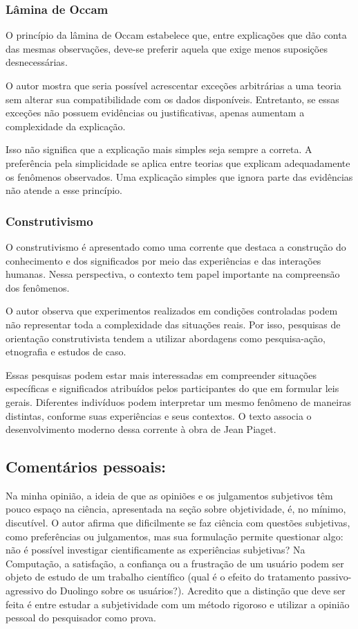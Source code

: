 \documentclass[12pt,a4paper]{article}
\begin{document}
\subsubsection{Lâmina de Occam}

O princípio da lâmina de Occam estabelece que, entre explicações que dão conta das mesmas observações, deve-se preferir aquela que exige menos suposições desnecessárias.

O autor mostra que seria possível acrescentar exceções arbitrárias a uma teoria sem alterar sua compatibilidade com os dados disponíveis. Entretanto, se essas exceções não possuem evidências ou justificativas, apenas aumentam a complexidade da explicação.

Isso não significa que a explicação mais simples seja sempre a correta. A preferência pela simplicidade se aplica entre teorias que explicam adequadamente os fenômenos observados. Uma explicação simples que ignora parte das evidências não atende a esse princípio.

\subsubsection{Construtivismo}

O construtivismo é apresentado como uma corrente que destaca a construção do conhecimento e dos significados por meio das experiências e das interações humanas. Nessa perspectiva, o contexto tem papel importante na compreensão dos fenômenos.

O autor observa que experimentos realizados em condições controladas podem não representar toda a complexidade das situações reais. Por isso, pesquisas de orientação construtivista tendem a utilizar abordagens como pesquisa-ação, etnografia e estudos de caso.

Essas pesquisas podem estar mais interessadas em compreender situações específicas e significados atribuídos pelos participantes do que em formular leis gerais. Diferentes indivíduos podem interpretar um mesmo fenômeno de maneiras distintas, conforme suas experiências e seus contextos. O texto associa o desenvolvimento moderno dessa corrente à obra de Jean Piaget.

\subsection{Comentários pessoais:}
Na minha opinião, a ideia de que as opiniões e os julgamentos subjetivos têm pouco espaço na ciência, apresentada na seção sobre objetividade, é, no mínimo, discutível.
O autor afirma que dificilmente se faz ciência com questões subjetivas, como preferências ou julgamentos, mas sua formulação permite questionar algo: não é possível investigar cientificamente as experiências subjetivas? Na Computação, a satisfação, a confiança ou a frustração de um usuário podem ser objeto de estudo de um trabalho científico (qual é o efeito do tratamento passivo-agressivo do Duolingo sobre os usuários?). Acredito que a distinção que deve ser feita é entre estudar a subjetividade com um método rigoroso e utilizar a opinião pessoal do pesquisador como prova. 
\end{document}
